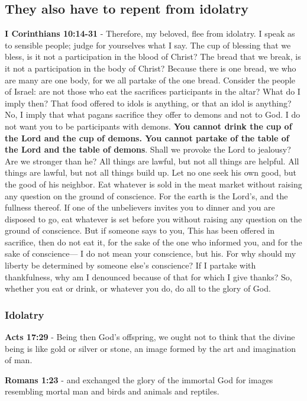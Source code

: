 \documentclass[11pt]{article}
\begin{document}
\subsection{They also have to repent from idolatry}
\label{sec:org1ffc2eb}
\textbf{I Corinthians 10:14-31} - Therefore, my beloved, flee from idolatry. I speak as to sensible people; judge for yourselves what I say. The cup of blessing that we bless, is it not a participation in the blood of Christ? The bread that we break, is it not a participation in the body of Christ? Because there is one bread, we who are many are one body, for we all partake of the one bread. Consider the people of Israel: are not those who eat the sacrifices participants in the altar? What do I imply then? That food offered to idols is anything, or that an idol is anything? No, I imply that what pagans sacrifice they offer to demons and not to God. I do not want you to be participants with demons. \textbf{You cannot drink the cup of the Lord and the cup of demons. You cannot partake of the table of the Lord and the table of demons}. Shall we provoke the Lord to jealousy? Are we stronger than he? All things are lawful, but not all things are helpful. All things are lawful, but not all things build up. Let no one seek his own good, but the good of his neighbor. Eat whatever is sold in the meat market without raising any question on the ground of conscience. For the earth is the Lord's, and the fullness thereof. If one of the unbelievers invites you to dinner and you are disposed to go, eat whatever is set before you without raising any question on the ground of conscience. But if someone says to you, This has been offered in sacrifice, then do not eat it, for the sake of the one who informed you, and for the sake of conscience— I do not mean your conscience, but his. For why should my liberty be determined by someone else's conscience? If I partake with thankfulness, why am I denounced because of that for which I give thanks? So, whether you eat or drink, or whatever you do, do all to the glory of God.

\subsubsection{Idolatry}
\label{sec:org4a55861}

\textbf{Acts 17:29} - Being then God's offspring, we ought not to think that the divine being is like gold or silver or stone, an image formed by the art and imagination of man.

\textbf{Romans 1:23} - and exchanged the glory of the immortal God for images resembling mortal man and birds and animals and reptiles.􄐺
\end{document}
